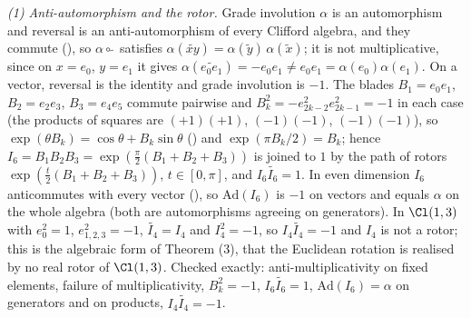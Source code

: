 \emph{(1) Anti-automorphism and the rotor.} Grade involution $\alpha$ is an automorphism and reversal is an anti-automorphism of every Clifford algebra, and they commute (), so $\alpha \circ \widetilde{\ }$ satisfies $\alpha(\widetilde{xy}) = \alpha(\widetilde y)\,\alpha(\widetilde x)$; it is not multiplicative, since on $x = e_0$, $y = e_1$ it gives $\alpha(\widetilde{e_0e_1}) = -e_0e_1 \neq e_0e_1 = \alpha(e_0)\alpha(e_1)$. On a vector, reversal is the identity and grade involution is $-1$. The blades $B_1 = e_0e_1$, $B_2 = e_2e_3$, $B_3 = e_4e_5$ commute pairwise and $B_k^2 = -e_{2k-2}^2 e_{2k-1}^2 = -1$ in each case (the products of squares are $(+1)(+1)$, $(-1)(-1)$, $(-1)(-1)$), so $\exp(\theta B_k) = \cos\theta + B_k \sin\theta$ () and $\exp(\pi B_k/2) = B_k$; hence $I_6 = B_1B_2B_3 = \exp(\tfrac{\pi}{2}(B_1+B_2+B_3))$ is joined to $1$ by the path of rotors $\exp(\tfrac{t}{2}(B_1+B_2+B_3))$, $t\in[0,\pi]$, and $I_6\widetilde{I_6} = 1$. In even dimension $I_6$ anticommutes with every vector (), so $\mathrm{Ad}(I_6)$ is $-1$ on vectors and equals $\alpha$ on the whole algebra (both are automorphisms agreeing on generators). In $\Cl(1,3)$ with $e_0^2 = 1$, $e_{1,2,3}^2 = -1$, $\widetilde{I_4} = I_4$ and $I_4^2 = -1$, so $I_4\widetilde{I_4} = -1$ and $I_4$ is not a rotor; this is the algebraic form of Theorem (3), that the Euclidean rotation is realised by no real rotor of $\Cl(1,3)$. Checked exactly: anti-multiplicativity on fixed elements, failure of multiplicativity, $B_k^2 = -1$, $I_6\widetilde{I_6} = 1$, $\mathrm{Ad}(I_6) = \alpha$ on generators and on products, $I_4\widetilde{I_4} = -1$.

